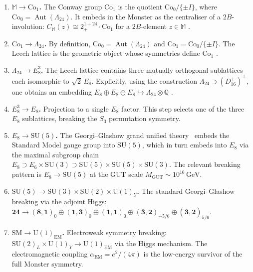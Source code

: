 \documentclass[11pt,a4paper]{article}
\theoremstyle{plain}
\theoremstyle{remark}
\newcommand{\Q}{\mathbb{Q}}
\newcommand{\Aut}{\operatorname{Aut}}
\newcommand{\SU}{\mathrm{SU}}
\newcommand{\aEM}{\alpha_{\mathrm{EM}}}
\begin{document}
\begin{enumerate}[label=\textbf{Step \arabic*.},itemsep=6pt,leftmargin=3em]

\item \textbf{$\mathbb{M}\to\mathrm{Co}_1$.}
The Conway group $\mathrm{Co}_1$ is the quotient $\mathrm{Co}_0/\{\pm I\}$,
where $\mathrm{Co}_0=\Aut(\Lambda_{24})$.
It embeds in the Monster as the centraliser of a $2B$-involution:
$C_{\mathbb{M}}(z)\cong 2_+^{1+24}\cdot\mathrm{Co}_1$ for a $2B$-element
$z\in\mathbb{M}$ \cite{conway-norton1979}.

\item \textbf{$\mathrm{Co}_1\to\Lambda_{24}$.}
By definition, $\mathrm{Co}_0=\Aut(\Lambda_{24})$ and $\mathrm{Co}_1 =
\mathrm{Co}_0/\{\pm I\}$.  The Leech lattice is the geometric object
whose symmetries define $\mathrm{Co}_1$ \cite{conway-sloane1999}.

\item \textbf{$\Lambda_{24}\to E_8^3$.}
The Leech lattice contains three mutually orthogonal sublattices each
isomorphic to $\sqrt{2}\,E_8$.  Explicitly, using the construction
$\Lambda_{24}\supset (D_{16}^+)^{\perp}$, one obtains an embedding
$E_8\oplus E_8\oplus E_8 \hookrightarrow \Lambda_{24}\otimes\Q$
\cite{conway-sloane1999}.

\item \textbf{$E_8^3\to E_8$.}
Projection to a single $E_8$ factor.  This step selects one of the
three $E_8$ sublattices, breaking the $S_3$ permutation symmetry.

\item \textbf{$E_8\to\SU(5)$.}
The Georgi--Glashow grand unified theory~\cite{georgi-glashow1974}
embeds the Standard Model gauge group into $\SU(5)$, which in turn
embeds into $E_8$ via the maximal subgroup chain
$E_8\supset E_6\times\SU(3)\supset\SU(5)\times\SU(5)\times\SU(3)$.
The relevant breaking pattern is $E_8\to\SU(5)$ at the GUT scale
$M_{\mathrm{GUT}}\sim 10^{16}\,\mathrm{GeV}$.

\item \textbf{$\SU(5)\to\SU(3)\times\SU(2)\times\mathrm{U}(1)_Y$.}
The standard Georgi--Glashow breaking via the adjoint Higgs:
$\mathbf{24}\to(\mathbf{8},\mathbf{1})_0\oplus(\mathbf{1},\mathbf{3})_0
\oplus(\mathbf{1},\mathbf{1})_0\oplus(\mathbf{3},\mathbf{2})_{-5/6}
\oplus(\bar{\mathbf{3}},\mathbf{2})_{5/6}$.

\item \textbf{$\mathrm{SM}\to\mathrm{U}(1)_{\mathrm{EM}}$.}
Electroweak symmetry breaking: $\SU(2)_L\times\mathrm{U}(1)_Y\to
\mathrm{U}(1)_{\mathrm{EM}}$ via the Higgs mechanism.
The electromagnetic coupling $\aEM=e^2/(4\pi)$ is the low-energy
survivor of the full Monster symmetry.

\end{enumerate}
\end{document}
